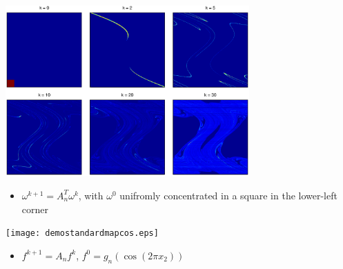 \documentclass[dvips,landscape]{foils}
\begin{document}
\newpage
\centerline{
\includegraphics[width=0.7\textwidth,trim=1cm 1cm 1cm 1cm]{demostandardmapsing.eps}
}
\begin{itemize}
\setlength{\topsep}{0cm}\setlength{\parskip}{0cm}\setlength{\parsep}{0cm}\setlength{\itemsep}{0cm}
\item $\omega^{k+1} = A_n^T \omega^{k}$, with $\omega^0$ unifromly concentrated in a square in the lower-left corner 
\end{itemize}

\newpage
\centerline{
\texttt{[image: demostandardmapcos.eps]}
}
\begin{itemize}
\setlength{\topsep}{0cm}\setlength{\parskip}{0cm}\setlength{\parsep}{0cm}\setlength{\itemsep}{0cm}
\item $f^{k+1} = A_n f^{k}$, $ f^0 = g_n(\cos(2\pi x_2))$
\end{itemize}
\end{document}
